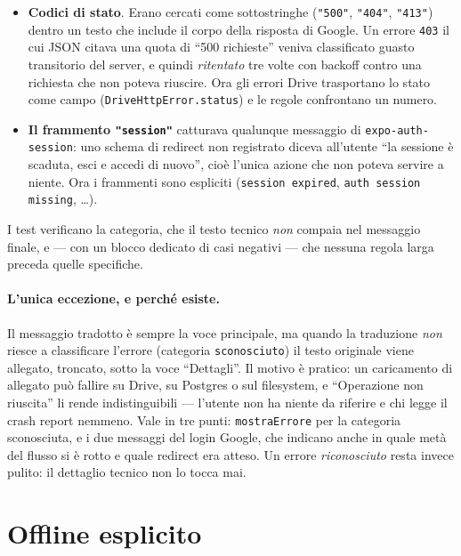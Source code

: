 \documentclass[11pt,a4paper]{report}
\begin{document}
\begin{itemize}[nosep]
  \item \textbf{Codici di stato}. Erano cercati come sottostringhe
        (\texttt{"500"}, \texttt{"404"}, \texttt{"413"}) dentro un testo che
        include il corpo della risposta di Google. Un errore \texttt{403} il cui
        JSON citava una quota di ``500 richieste'' veniva classificato guasto
        transitorio del server, e quindi \emph{ritentato} tre volte con
        backoff contro una richiesta che non poteva riuscire. Ora gli errori
        Drive trasportano lo stato come campo (\texttt{DriveHttpError.status})
        e le regole confrontano un numero.
  \item \textbf{Il frammento \texttt{"session"}} catturava qualunque messaggio
        di \texttt{expo-auth-session}: uno schema di redirect non registrato
        diceva all'utente ``la sessione \`e scaduta, esci e accedi di nuovo'',
        cio\`e l'unica azione che non poteva servire a niente. Ora i frammenti
        sono espliciti (\texttt{session expired}, \texttt{auth session
        missing}, \dots).
\end{itemize}

I test verificano la categoria, che il testo tecnico \emph{non} compaia nel
messaggio finale, e --- con un blocco dedicato di casi negativi --- che
nessuna regola larga preceda quelle specifiche.

\paragraph{L'unica eccezione, e perch\'e esiste.} Il messaggio tradotto \`e
sempre la voce principale, ma quando la traduzione \emph{non} riesce a
classificare l'errore (categoria \texttt{sconosciuto}) il testo originale viene
allegato, troncato, sotto la voce ``Dettagli''. Il motivo \`e pratico: un
caricamento di allegato pu\`o fallire su Drive, su Postgres o sul filesystem,
e ``Operazione non riuscita'' li rende indistinguibili --- l'utente non ha
niente da riferire e chi legge il crash report nemmeno. Vale in tre punti:
\texttt{mostraErrore} per la categoria sconosciuta, e i due messaggi del login
Google, che indicano anche in quale met\`a del flusso si \`e rotto e quale
redirect era atteso. Un errore \emph{riconosciuto} resta invece pulito: il
dettaglio tecnico non lo tocca mai.

\section{Offline esplicito}
\end{document}
